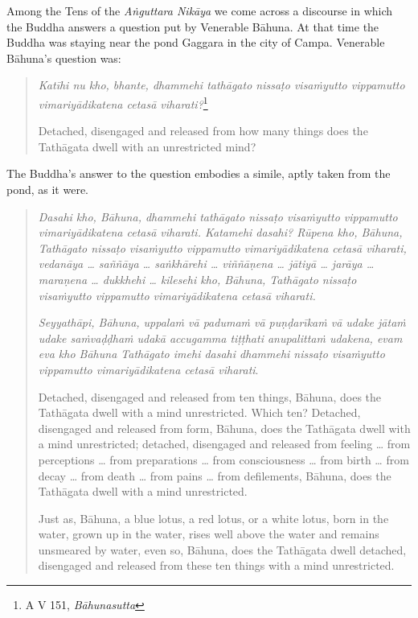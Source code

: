 Among the Tens of the \emph{Aṅguttara Nikāya} we come across a discourse in which the Buddha answers a question put by Venerable Bāhuna. At that time the Buddha was staying near the pond Gaggara in the city of Campa. Venerable Bāhuna's question was:

\enlargethispage{\baselineskip}

\begin{quote}
\emph{Katīhi nu kho, bhante, dhammehi tathāgato nissaṭo visaṁyutto vippamutto vimariyādikatena cetasā viharati?}\footnote{A V 151, \emph{Bāhunasutta}}

Detached, disengaged and released from how many things does the Tathāgata dwell with an unrestricted mind?
\end{quote}

The Buddha's answer to the question embodies a simile, aptly taken from the pond, as it were.

\begin{quote}
\emph{Dasahi kho, Bāhuna, dhammehi tathāgato nissaṭo visaṁyutto vippamutto vimariyādikatena cetasā viharati. Katamehi dasahi? Rūpena kho, Bāhuna, Tathāgato nissaṭo visaṁyutto vippamutto vimariyādikatena cetasā viharati, vedanāya \ldots{} saññāya \ldots{} saṅkhārehi \ldots{} viññāṇena \ldots{} jātiyā \ldots{} jarāya \ldots{} maraṇena \ldots{} dukkhehi \ldots{} kilesehi kho, Bāhuna, Tathāgato nissaṭo visaṁyutto vippamutto vimariyādikatena cetasā viharati.}

\emph{Seyyathāpi, Bāhuna, uppalaṁ vā padumaṁ vā puṇḍarīkaṁ vā udake jātaṁ udake saṁvaḍḍhaṁ udakā accugamma tiṭṭhati anupalittaṁ udakena, evam eva kho Bāhuna Tathāgato imehi dasahi dhammehi nissaṭo visaṁyutto vippamutto vimariyādikatena cetasā viharati}.

Detached, disengaged and released from ten things, Bāhuna, does the Tathāgata dwell with a mind unrestricted. Which ten? Detached, disengaged and released from form, Bāhuna, does the Tathāgata dwell with a mind unrestricted; detached, disengaged and released from feeling \ldots{} from perceptions \ldots{} from preparations \ldots{} from consciousness \ldots{} from birth \ldots{} from decay \ldots{} from death \ldots{} from pains \ldots{} from defilements, Bāhuna, does the Tathāgata dwell with a mind unrestricted.

Just as, Bāhuna, a blue lotus, a red lotus, or a white lotus, born in the water, grown up in the water, rises well above the water and remains unsmeared by water, even so, Bāhuna, does the Tathāgata dwell detached, disengaged and released from these ten things with a mind unrestricted.
\end{quote}

